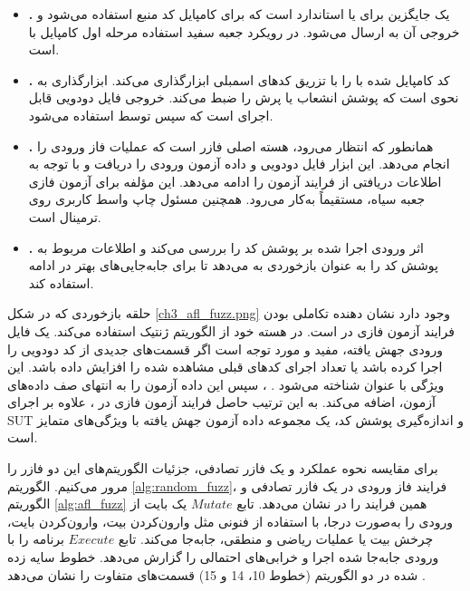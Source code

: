 \begin{itemize}
	\item {
	\textbf{.}
	یک جایگزین برای   یا   استاندارد است که برای کامپایل کد منبع   استفاده می‌شود و خروجی آن به   ارسال می‌شود. در رویکرد جعبه سفید استفاده مرحله اول کامپایل  با
	  است.

}
\item {
	\textbf{.}
	کد کامپایل شده با  را با تزریق کدهای اسمبلی ابزارگذاری می‌کند. ابزارگذاری به نحوی است که پوشش انشعاب  یا پرش را ضبط می‌کند. خروجی   فایل دودویی قابل اجرای   است که سپس توسط
	  استفاده می‌شود.
}
\item {
\textbf{.}
همانطور که انتظار می‌رود، هسته اصلی فازر است که عملیات فاز ورودی را انجام می‌دهد. این ابزار فایل دودویی و داده آزمون ورودی را دریافت و با توجه به اطلاعات دریافتی از  فرایند آزمون را ادامه می‌دهد. این مؤلفه برای آزمون فازی جعبه سیاه، مستقیماً به‌کار می‌رود.  همچنین مسئول چاپ واسط کاربری روی ترمینال است.
}

\item {
\textbf{.}
 اثر ورودی اجرا شده بر پوشش کد را بررسی می‌کند و اطلاعات مربوط به پوشش کد را به عنوان بازخوردی به  می‌دهد تا برای جابه‌جایی‌های بهتر در ادامه استفاده کند.
}

\end{itemize}
 
حلقه بازخوردی که در ‏شکل \ref{ch3_afl_fuzz.png} وجود دارد نشان دهنده تکاملی بودن فرایند آزمون فازی در  است.  در هسته خود از الگوریتم ژنتیک استفاده می‌کند. یک فایل ورودی جهش یافته، مفید و مورد توجه است اگر قسمت‌های جدیدی از کد دودویی را اجرا کرده باشد یا تعداد اجرای کدهای قبلی مشاهده شده را افزایش داده باشد. این ویژگی با عنوان  شناخته می‌شود \cite{DBLP:journals/corr/abs-1711-04596}. ، سپس این داده آزمون را به انتهای صف داده‌های آزمون، اضافه می‌کند. به این ترتیب حاصل فرایند آزمون فازی در ، علاوه بر اجرای \gls{SUT} و اندازه‌گیری پوشش کد، یک مجموعه داده آزمون جهش یافته با ویژگی‌های متمایز است. 


برای مقایسه نحوه عملکرد  و یک فازر تصادفی، جزئیات الگوریتم‌های این دو فازر را مرور می‌کنیم. الگوریتم \ref{alg:random_fuzz}، فرایند فاز ورودی در یک فازر تصادفی و الگوریتم \ref{alg:afl_fuzz} همین فرایند را در  نشان می‌دهد. تابع $ Mutate $ یک بایت از ورودی را به‌صورت درجا، با استفاده از فنونی مثل وارون‌کردن بیت، وارون‌کردن بایت، چرخش بیت‌ یا عملیات ریاضی و منطقی، جابه‌جا می‌‌کند. تابع $ Execute $ برنامه را با ورودی جابه‌جا شده اجرا و خرابی‌های احتمالی را گزارش می‌دهد. خطوط سایه زده شده در دو الگوریتم (خطوط 10، 14 و 15) قسمت‌های متفاوت را نشان می‌دهد \cite{DBLP:journals/corr/abs-1711-04596}. 


